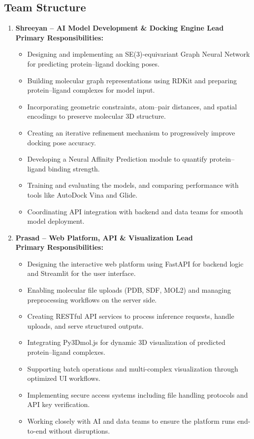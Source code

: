 \documentclass[12pt,a4]{report}
\begin{document}
\subsection{Team Structure}
\begin{enumerate}

  \item \textbf{Shreeyan – AI Model Development \& Docking Engine Lead}\\

  \textbf{Primary Responsibilities:}
  \begin{itemize}
    \item Designing and implementing an SE(3)-equivariant Graph Neural Network for predicting protein–ligand docking poses.
    \item Building molecular graph representations using RDKit and preparing protein–ligand complexes for model input.
    \item Incorporating geometric constraints, atom–pair distances, and spatial encodings to preserve molecular 3D structure.
    \item Creating an iterative refinement mechanism to progressively improve docking pose accuracy.
    \item Developing a Neural Affinity Prediction module to quantify protein–ligand binding strength.
    \item Training and evaluating the models, and comparing performance with tools like AutoDock Vina and Glide.
    \item Coordinating API integration with backend and data teams for smooth model deployment.\\
  \end{itemize}

  \vspace{0.2cm}

  \item \textbf{Prasad – Web Platform, API \& Visualization Lead}\\

  \textbf{Primary Responsibilities:}
  \begin{itemize}
    \item Designing the interactive web platform using FastAPI for backend logic and Streamlit for the user interface.
    \item Enabling molecular file uploads (PDB, SDF, MOL2) and managing preprocessing workflows on the server side.
    \item Creating RESTful API services to process inference requests, handle uploads, and serve structured outputs.
    \item Integrating Py3Dmol.js for dynamic 3D visualization of predicted protein–ligand complexes.
    \item Supporting batch operations and multi-complex visualization through optimized UI workflows.
    \item Implementing secure access systems including file handling protocols and API key verification.
    \item Working closely with AI and data teams to ensure the platform runs end-to-end without disruptions.\\
  \end{itemize}


\end{enumerate}
\end{document}
